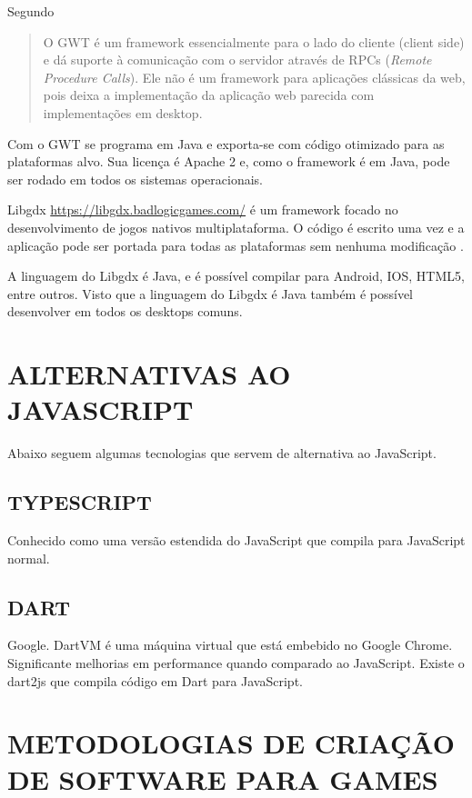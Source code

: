 Segundo \cite[pp. 29]{gtw}
\begin{quote}
O GWT é um framework essencialmente para o lado do cliente (client
side) e dá suporte à comunicação com o servidor através de RPCs
(\textit{Remote Procedure Calls}). Ele não é um framework para
aplicações clássicas da web, pois deixa a implementação da
aplicação web parecida com implementações em desktop.
\end{quote}

Com o GWT se programa em Java e exporta-se com código otimizado para
as plataformas alvo. Sua licença é Apache 2 e, como o framework é em Java,
pode ser rodado em todos os sistemas operacionais.

Libgdx \url{https://libgdx.badlogicgames.com/} é um framework
focado no desenvolvimento de jogos nativos multiplataforma. O
código é escrito uma vez e a aplicação pode ser portada para
todas as plataformas sem nenhuma modificação \autocite[pp.
8]{crossPlatformMobileGameDevelopment}.

A linguagem do Libgdx é Java, e é possível compilar para Android,
IOS, HTML5, entre outros. Visto que a linguagem do Libgdx é Java
também é possível desenvolver em todos os desktops comuns.

\chapter{ALTERNATIVAS AO JAVASCRIPT}

Abaixo seguem algumas tecnologias que servem de alternativa ao
JavaScript.

\section{TYPESCRIPT}

Conhecido como uma versão estendida do JavaScript que compila para
JavaScript normal.

\section{DART}

Google. DartVM é uma máquina virtual que está embebido no Google
Chrome. Significante melhorias em performance quando comparado
ao JavaScript. Existe o dart2js que compila código em Dart para
JavaScript.

\chapter{METODOLOGIAS DE CRIAÇÃO DE SOFTWARE PARA GAMES}

